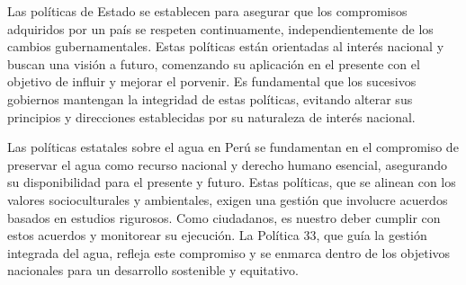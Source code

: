 

Las políticas de Estado se establecen para asegurar que los compromisos adquiridos por un país se respeten continuamente, independientemente de los cambios gubernamentales. Estas políticas están orientadas al interés nacional y buscan una visión a futuro, comenzando su aplicación en el presente con el objetivo de influir y mejorar el porvenir. Es fundamental que los sucesivos gobiernos mantengan la integridad de estas políticas, evitando alterar sus principios y direcciones establecidas por su naturaleza de interés nacional.

Las políticas estatales sobre el agua en Perú se fundamentan en el compromiso de preservar el agua como recurso nacional y derecho humano esencial, asegurando su disponibilidad para el presente y futuro. Estas políticas, que se alinean con los valores socioculturales y ambientales, exigen una gestión que involucre acuerdos basados en estudios rigurosos. Como ciudadanos, es nuestro deber cumplir con estos acuerdos y monitorear su ejecución. La Política 33, que guía la gestión integrada del agua, refleja este compromiso y se enmarca dentro de los objetivos nacionales para un desarrollo sostenible y equitativo.

